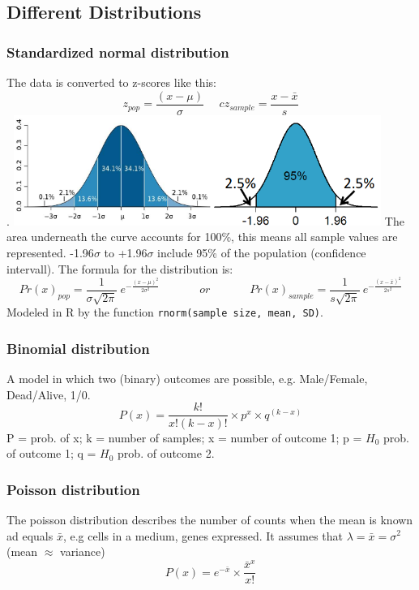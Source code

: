 \documentclass{article}
\begin{document}
\subsection{Different Distributions}

\subsubsection{Standardized normal distribution}
The data is converted to z-scores like this: $$z_{pop} = \frac{(x-\mu)}{\sigma} \: \: \: \: \: \: c z_{sample} = \frac{x-\bar{x}}{s}$$. 
\includegraphics[width = 0.9\textwidth]{intro/normalverteilung2.png}
The area underneath the curve accounts for  100\%, this means all sample values are represented. -1.96$\sigma$ to +1.96$\sigma$ include 95\% of the population (confidence intervall). The formula for the distribution is:
$$Pr(x)_{pop} = \frac{1}{\sigma \sqrt{2 \pi}}\: e^{-\frac{(x-\mu)^2}{2\sigma^2}} \: \: \: \: \: \: \;\;\;\;\;\;\;\ or \: \: \: \: \: \: \;\;\;\;\;\;\;\ Pr(x)_{sample} = \frac{1}{s \sqrt{2 \pi}}\: e^{-\frac{(x-\bar{x})^2}{2 s^2}}$$
Modeled in R by the function \texttt{rnorm(sample size, mean, SD)}.

\subsubsection{Binomial distribution}
A model in which two (binary) outcomes are possible, e.g. Male/Female, Dead/Alive, 1/0.
$$P(x) = \frac{k!}{x!(k-x)!} \times p^x \times q^{(k-x)}$$
P = prob. of x; k = number of samples; x = number of outcome 1; p = $H_0$ prob. of outcome 1; q = $H_0$ prob. of outcome 2. 

\subsubsection{Poisson distribution}
The poisson distribution describes the number of counts when the mean is known ad equals $\bar{x}$, e.g cells in a medium, genes expressed. It assumes that $\lambda = \bar{x} = \sigma^2$ (mean $\approx$ variance)
$$P(x) = e^{-\bar{x}} \times \frac{\bar{x}^x}{x!}$$
\end{document}
